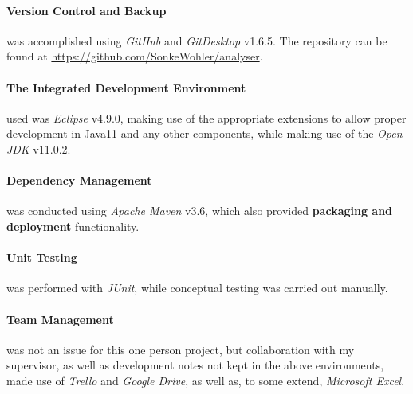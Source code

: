 \documentclass[main.tex]{subfiles}
\begin{document}
        \paragraph{Version Control and Backup} was accomplished using \textit{GitHub} and \textit{GitDesktop} v1.6.5. The repository can be found at \href{https://github.com/SonkeWohler/analyser}{https://github.com/SonkeWohler/analyser}.
        
        \paragraph{The Integrated Development Environment} used was \textit{Eclipse} v4.9.0, making use of the appropriate extensions to allow proper development in Java11 and any other components, while making use of the \textit{Open JDK} v11.0.2.
        
        \paragraph{Dependency Management} was conducted using \textit{Apache Maven} v3.6, which also provided \textbf{packaging and deployment} functionality.
        
        \paragraph{Unit Testing} was performed with \textit{JUnit}, while conceptual testing was carried out  manually.
        
        \paragraph{Team Management} was not an issue for this one person project, but collaboration with my supervisor, as well as development notes not kept in the above environments, made use of \textit{Trello} and \textit{Google Drive}, as well as, to some extend, \textit{Microsoft Excel}.
        
        
    
\end{document}
